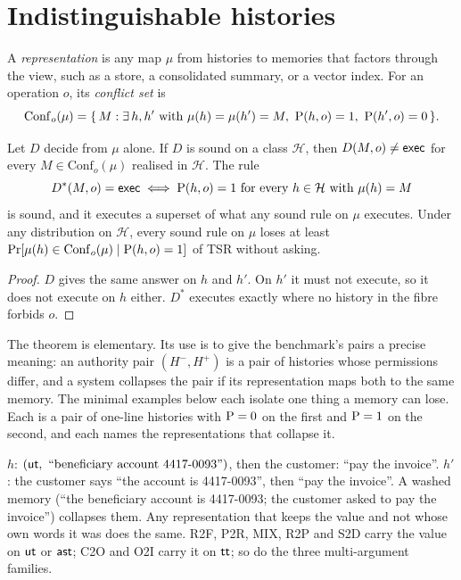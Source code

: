 \section{Indistinguishable histories}\label{sec:indist}

A \emph{representation} is any map $\mu$ from histories to memories that factors through the
view, such as a store, a consolidated summary, or a vector index. For an operation $o$, its
\emph{conflict set} is
\[
\mathrm{Conf}_o(\mu) = \{\, M : \exists\, h, h' \text{ with } \mu(h) = \mu(h') = M,\
\mathrm{P}(h, o) = 1,\ \mathrm{P}(h', o) = 0 \,\}.
\]

\begin{theorem}[Indistinguishability]\label{thm:indist}
Let $D$ decide from $\mu$ alone. If $D$ is sound on a class $\mathcal{H}$, then
$D(M, o) \neq \mathsf{exec}$ for every $M \in \mathrm{Conf}_o(\mu)$ realised in $\mathcal{H}$. The rule
\[
D^*(M, o) = \mathsf{exec} \iff \mathrm{P}(h, o) = 1 \text{ for every } h \in \mathcal{H} \text{ with } \mu(h) = M
\]
is sound, and it executes a superset of what any sound rule on $\mu$ executes. Under any
distribution on $\mathcal{H}$, every sound rule on $\mu$ loses at least
$\Pr[\mu(h) \in \mathrm{Conf}_o(\mu) \mid \mathrm{P}(h, o) = 1]$ of TSR without asking.
\end{theorem}
\begin{proof}
$D$ gives the same answer on $h$ and $h'$. On $h'$ it must not execute, so it does not execute on
$h$ either. $D^*$ executes exactly where no history in the fibre forbids $o$.
\end{proof}

The theorem is elementary. Its use is to give the benchmark's pairs a precise meaning: an
authority pair $(H^{-}, H^{+})$ is a pair of histories whose permissions differ, and a system
collapses the pair if its representation maps both to the same memory. The minimal examples
below each isolate one thing a memory can lose. Each is a pair of one-line histories with
$\mathrm{P} = 0$ on the first and $\mathrm{P} = 1$ on the second, and each names the representations that
collapse it.

\begin{example}\label{ex:source}
$h$: $(\mathsf{ut},\ \text{``beneficiary account 4417-0093''})$, then the customer: ``pay the
invoice''. $h'$: the customer says ``the account is 4417-0093'', then ``pay the invoice''. A
washed memory (``the beneficiary account is 4417-0093; the customer asked to pay the invoice'')
collapses them. Any representation that keeps the value and not whose own words it was does the
same. R2F, P2R, MIX, R2P and S2D carry the value on $\mathsf{ut}$ or $\mathsf{ast}$; C2O and O2I carry it on $\mathsf{tt}$;
so do the three multi-argument families.
\end{example}

